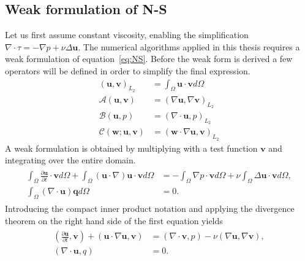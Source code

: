 \subsection{Weak formulation of N-S}
Let us first assume constant viscosity, enabling the simplification $\nabla \cdot \tau = -\nabla p + \nu \Delta \mathbf{u}$.
The numerical algorithms applied in this thesis requires a weak formulation of equation~\ref{eq:NS}.
Before the weak form is derived a few operators will be defined in order to simplify the final 
expression.
%
\begin{align}
    ( \mathbf{u},\mathbf{v})_{L_2} &= \int_{\Omega}\mathbf{u} \cdot \mathbf{v} d\Omega\\
    \mathcal{A}(\mathbf{u},\mathbf{v}) &= (\nabla \mathbf{u},\nabla \mathbf{v})_{L_2}\\
    \mathcal{B}(\mathbf{u},p) &= (\nabla \cdot \mathbf{u},p)_{L_2}\\
    \mathcal{C}(\mathbf{w};\mathbf{u},\mathbf{v}) &= (\mathbf{w}\cdot \nabla \mathbf{u},\mathbf{v})_{L_2}
    \label{eq:weakoperators}
\end{align}
%
A weak formulation is obtained by multiplying with a test function $\mathbf{v}$ and integrating over
the entire domain.
\begin{align}
    \begin{split}
        \int_{\Omega}\frac{\partial \mathbf{u}}{\partial t}\cdot\mathbf{v}d\Omega
        + \int_{\Omega}(\mathbf{u}\cdot \nabla)\mathbf{u}\cdot\mathbf{v}d\Omega
        &= -\int_{\Omega}\nabla p\cdot \mathbf{v} d\Omega 
        + \nu \int_{\Omega}\Delta\mathbf{u}\cdot\mathbf{v}d\Omega, \\
		\int_{\Omega}(\nabla \cdot \mathbf{u}) \mathbf{q}d\Omega &= 0.
    \end{split}
	\label{eq:NSweak1}
\end{align}
Introducing the compact inner product notation and applying the divergence theorem on the right hand side of 
the first equation yields
\begin{align}
    \begin{split}
        (\frac{\partial \mathbf{u}}{\partial t},\mathbf{v})
        + (\mathbf{u}\cdot \nabla\mathbf{u},\mathbf{v})
        &= (\nabla \cdot \mathbf{v} , p ) 
        -\nu(\nabla \mathbf{u},\nabla \mathbf{v}), \\
		(\nabla \cdot \mathbf{u},q) &= 0.
    \end{split}
	\label{eq:NSweak}
\end{align}
